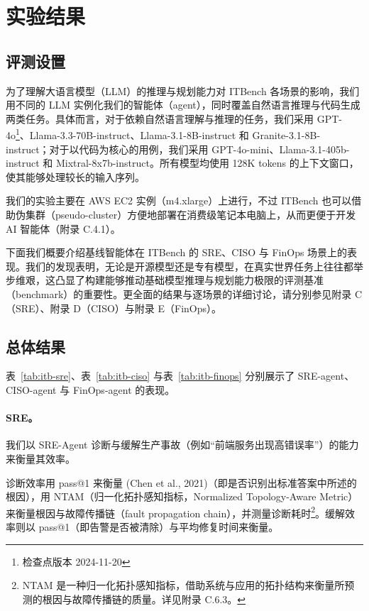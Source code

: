 \documentclass[10pt,UTF8,fontset=fandol]{ctexart}
\begin{document}
\section{实验结果}

\subsection{评测设置}

为了理解大语言模型（LLM）的推理与规划能力对 ITBench 各场景的影响，我们用不同的 LLM 实例化我们的智能体（agent），同时覆盖自然语言推理与代码生成两类任务。具体而言，对于依赖自然语言理解与推理的任务，我们采用 GPT-4o\footnote{检查点版本 2024-11-20}、Llama-3.3-70B-instruct、Llama-3.1-8B-instruct 和 Granite-3.1-8B-instruct；对于以代码为核心的用例，我们采用 GPT-4o-mini、Llama-3.1-405b-instruct 和 Mixtral-8x7b-instruct。所有模型均使用 128K tokens 的上下文窗口，使其能够处理较长的输入序列。

我们的实验主要在 AWS EC2 实例（m4.xlarge）上进行，不过 ITBench 也可以借助伪集群（pseudo-cluster）方便地部署在消费级笔记本电脑上，从而更便于开发 AI 智能体（附录 C.4.1）。

下面我们概要介绍基线智能体在 ITBench 的 SRE、CISO 与 FinOps 场景上的表现。我们的发现表明，无论是开源模型还是专有模型，在真实世界任务上往往都举步维艰，这凸显了构建能够推动基础模型推理与规划能力极限的评测基准（benchmark）的重要性。更全面的结果与逐场景的详细讨论，请分别参见附录 C（SRE）、附录 D（CISO）与附录 E（FinOps）。

\subsection{总体结果}

表~\ref{tab:itb-sre}、表~\ref{tab:itb-ciso} 与表~\ref{tab:itb-finops} 分别展示了 SRE-agent、CISO-agent 与 FinOps-agent 的表现。

\paragraph{SRE。} 我们以 SRE-Agent 诊断与缓解生产事故（例如“前端服务出现高错误率”）的能力来衡量其效率。

诊断效率用 pass@1 来衡量 (Chen et al., 2021)（即是否识别出标准答案中所述的根因），用 NTAM（归一化拓扑感知指标，Normalized Topology-Aware Metric）来衡量根因与故障传播链（fault propagation chain），并测量诊断耗时\footnote{NTAM 是一种归一化拓扑感知指标，借助系统与应用的拓扑结构来衡量所预测的根因与故障传播链的质量。详见附录 C.6.3。}。缓解效率则以 pass@1（即告警是否被清除）与平均修复时间来衡量。
\end{document}
